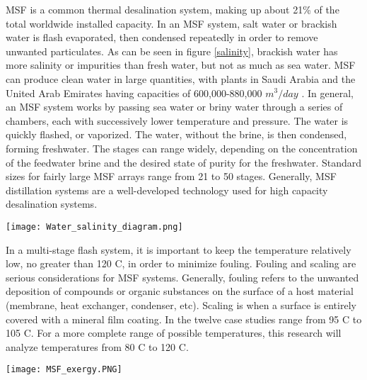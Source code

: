 MSF is a common thermal desalination system, making up about 21\% of the total worldwide installed capacity. In an MSF system, salt water or brackish water is flash evaporated, then condensed repeatedly in order to remove unwanted particulates. As can be seen in figure \ref{salinity}, brackish water has more salinity or impurities than fresh water, but not as much as sea water. MSF can produce clean water in large quantities, with plants in Saudi Arabia and the United Arab Emirates having capacities of 600,000-880,000 $m^3/day$ \cite{El-Dessouky2016}. In general, an MSF system works by passing sea water or briny water through a series of chambers, each with successively lower temperature and pressure.  The water is quickly flashed, or vaporized.  The water, without the brine, is then condensed, forming freshwater.  The stages can range widely, depending on the concentration of the feedwater brine and the desired state of purity for the freshwater. Standard sizes for fairly large MSF arrays range from 21 to 50 stages. Generally, MSF distillation systems are a well-developed technology used for high capacity desalination systems.
\begin{figure*}[h!]
\centering
\texttt{[image: Water\_salinity\_diagram.png]}
\caption{\small \sl This figure displays the differences between different water qualities}
\label{salinity}
\end{figure*}


In a multi-stage flash system, it is important to keep the temperature relatively low, no greater than 120 \degree C, in order to minimize fouling. Fouling and scaling are serious considerations for MSF systems.  Generally, fouling refers to the unwanted deposition of compounds or organic substances on the surface of a host material (membrane, heat exchanger, condenser, etc)\cite{Khayet2016}. Scaling is when a surface is entirely covered with a mineral film coating. In \cite{El-Dessouky2016} the twelve case studies range from 95 \degree C to 105 \degree C. For a more complete range of possible temperatures, this research will analyze temperatures from 80 \degree C to 120 \degree C.


\begin{figure*}[h!]
\centering

\texttt{[image: MSF\_exergy.PNG]}
\caption{\small \sl The Multi-Stage Flash exergy analysis diagram showing where exergy is lost in the system from \cite{Kahraman2005}}
\centering
\label{MSF_x}
\end{figure*}

